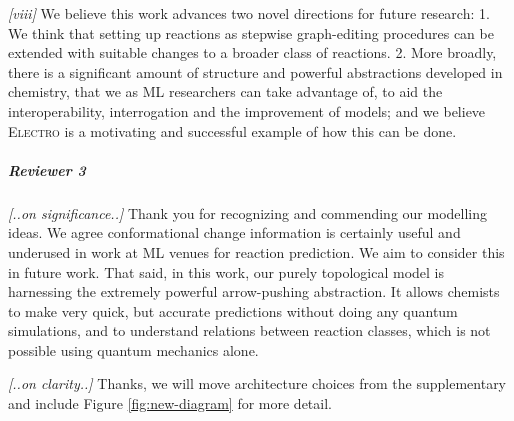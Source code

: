 \documentclass{article}
\newcommand{\ourModel}{\textsc{Electro}\xspace}
\begin{document}
\emph{[viii]}
We believe this work advances two novel directions for future research: 
  1. We think that setting up reactions as stepwise graph-editing procedures can be extended with suitable changes to a broader class of reactions.
 2. More broadly, there is a significant amount of structure and powerful abstractions developed in chemistry, that we as ML researchers can take advantage of, to aid the interoperability, interrogation and the improvement of  models;
and we believe \ourModel is a motivating and successful example of how this can be done.





 
 
 



\vspace{-5pt}
\subparagraph*{Reviewer 3}
\emph{[..on significance..]}
Thank you for recognizing and commending our modelling ideas. We agree conformational change information is certainly useful and underused in work at ML venues for reaction prediction. We aim to consider this in future work.
That said, in this work, our purely topological model is harnessing the extremely powerful arrow-pushing abstraction. 
It allows chemists to make very quick, but accurate predictions without doing any quantum simulations, and to understand relations between reaction classes, which is not possible using quantum mechanics alone. 

\emph{[..on clarity..]}
Thanks, we will move architecture choices from the supplementary and include Figure \ref{fig:new-diagram} for more detail.
\end{document}
